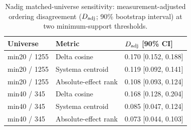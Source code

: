 \begin{table}[H]
\centering
\caption{Nadig matched-universe sensitivity: measurement-adjusted ordering disagreement ($D_{\rm adj}$; 90\% bootstrap interval) at two minimum-support thresholds.}
\label{tab:nadig}
\small
\begin{tabular}{lll}
\toprule
Universe & Metric & $D_{\rm adj}$ [90\% CI] \\
\midrule
min20 / 1255 & Delta cosine & 0.170 [0.152, 0.188] \\
min20 / 1255 & Systema centroid & 0.119 [0.092, 0.141] \\
min20 / 1255 & Absolute-effect rank & 0.108 [0.093, 0.124] \\
min40 / 345 & Delta cosine & 0.168 [0.128, 0.204] \\
min40 / 345 & Systema centroid & 0.085 [0.047, 0.124] \\
min40 / 345 & Absolute-effect rank & 0.073 [0.044, 0.103] \\
\bottomrule
\end{tabular}
\end{table}
